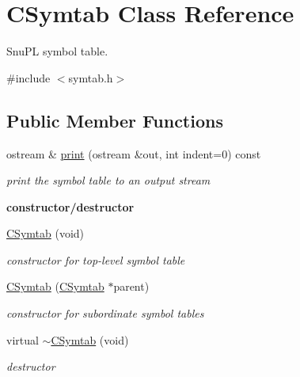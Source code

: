 \hypertarget{classCSymtab}{\section{C\-Symtab Class Reference}
\label{classCSymtab}
}


Snu\-P\-L symbol table.  




{\ttfamily \#include $<$symtab.\-h$>$}

\subsection*{Public Member Functions}
\begin{DoxyCompactItemize}
\item 
ostream \& \hyperlink{classCSymtab_a3573d6f87f844d983020cf62945ec2d3}{print} (ostream \&out, int indent=0) const 
\begin{DoxyCompactList}\small\item\em print the symbol table to an output stream \end{DoxyCompactList}\end{DoxyCompactItemize}
\begin{Indent}{\bf constructor/destructor}\par
\begin{DoxyCompactItemize}
\item 
\hypertarget{classCSymtab_a24ae77cf6cc0088cd06dd2f3c8b60c69}{\hyperlink{classCSymtab_a24ae77cf6cc0088cd06dd2f3c8b60c69}{C\-Symtab} (void)}\label{classCSymtab_a24ae77cf6cc0088cd06dd2f3c8b60c69}

\begin{DoxyCompactList}\small\item\em constructor for top-\/level symbol table \end{DoxyCompactList}\item 
\hyperlink{classCSymtab_ab7250068e10c87e4c6448046ef619e0e}{C\-Symtab} (\hyperlink{classCSymtab}{C\-Symtab} $\ast$parent)
\begin{DoxyCompactList}\small\item\em constructor for subordinate symbol tables \end{DoxyCompactList}\item 
\hypertarget{classCSymtab_a9732bc2f4a0b4b6ace8689e63c213215}{virtual \hyperlink{classCSymtab_a9732bc2f4a0b4b6ace8689e63c213215}{$\sim$\-C\-Symtab} (void)}\label{classCSymtab_a9732bc2f4a0b4b6ace8689e63c213215}

\begin{DoxyCompactList}\small\item\em destructor \end{DoxyCompactList}\end{DoxyCompactItemize}
\end{Indent}
